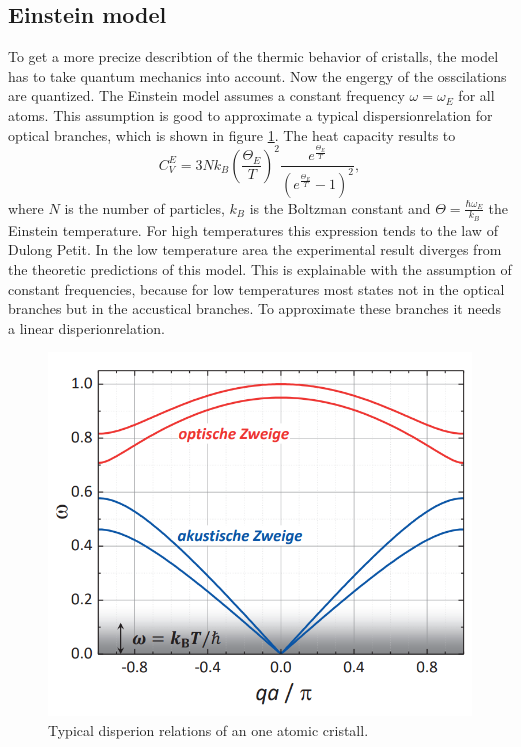 \subsection{Einstein model}

To get a more precize describtion of the thermic behavior of cristalls, the model has to take quantum mechanics into account. 
Now the engergy of the osscilations are quantized.
The Einstein model assumes a constant frequency $\omega = \omega_E$ for all atoms.
This assumption is good to approximate a typical dispersionrelation for optical branches, which is shown in figure \ref{fig:disperion}. 
The heat capacity results to 
\begin{equation}
    C_V^E = 3 N k_B\left(\frac{\Theta_E}{T}\right)^2\frac{e^{\frac{\Theta_E}{T}}}{\left(e^\frac{\Theta_E}{T}-1\right)^2},
\end{equation}
where $N$ is the number of particles, $k_B$ is the Boltzman constant and $\Theta=\frac{\hbar \omega_E}{k_B}$ the Einstein temperature.
For high temperatures this expression tends to the law of Dulong Petit.
In the low temperature area the experimental result diverges from the theoretic predictions of this model.
This is explainable with the assumption of constant frequencies, because for low temperatures most states not in the optical branches but in the accustical branches.
To approximate these branches it needs a linear disperionrelation.

\begin{figure}
    \centering 
    \includegraphics[width=.8\textwidth]{bilder/Disperion.png}
    \caption{Typical disperion relations of an one atomic cristall. \cite[S. 223]{gross2012festkoerperphysik}}
    \label{fig:disperion}
\end{figure}


